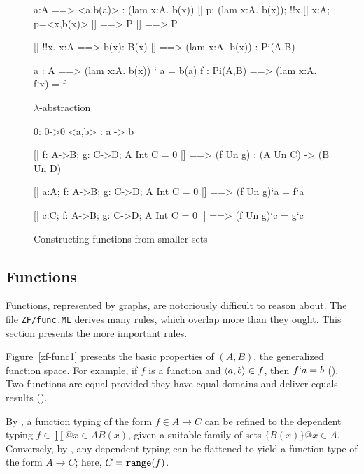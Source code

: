 \begin{figure}
\begin{ttbox}
         a:A ==> <a,b(a)> : (lam x:A. b(x))
         [| p: (lam x:A. b(x));  !!x.[| x:A; p=<x,b(x)> |] ==> P 
             |] ==>  P

     [| !!x. x:A ==> b(x): B(x) |] ==> (lam x:A. b(x)) : Pi(A,B)

         a : A ==> (lam x:A. b(x)) ` a = b(a)
          f : Pi(A,B) ==> (lam x:A. f`x) = f
\end{ttbox}
\caption{$\lambda$-abstraction} \label{zf-lam}
\end{figure}


\begin{figure}
\begin{ttbox}
            0: 0->0
           {\ttlbrace}<a,b>{\ttrbrace} : {\ttlbrace}a{\ttrbrace} -> {\ttlbrace}b{\ttrbrace}

      [| f: A->B;  g: C->D;  A Int C = 0  |] ==>  
                     (f Un g) : (A Un C) -> (B Un D)

  [| a:A;  f: A->B;  g: C->D;  A Int C = 0 |] ==>  
                     (f Un g)`a = f`a

  [| c:C;  f: A->B;  g: C->D;  A Int C = 0 |] ==>  
                     (f Un g)`c = g`c
\end{ttbox}
\caption{Constructing functions from smaller sets} \label{zf-func2}
\end{figure}


\subsection{Functions}
Functions, represented by graphs, are notoriously difficult to reason
about.  The file \texttt{ZF/func.ML} derives many rules, which overlap more
than they ought.  This section presents the more important rules.

Figure~\ref{zf-func1} presents the basic properties of $(A,B)$,
the generalized function space.  For example, if $f$ is a function and
$\langle a,b\rangle\in f$, then $f`a=b$ ().  Two functions
are equal provided they have equal domains and deliver equals results
().

By , a function typing of the form $f\in A\to C$ can be
refined to the dependent typing $f\in\prod@{x\in A}B(x)$, given a suitable
family of sets $\{B(x)\}@{x\in A}$.  Conversely, by ,
any dependent typing can be flattened to yield a function type of the form
$A\to C$; here, $C={\tt range}(f)$.

